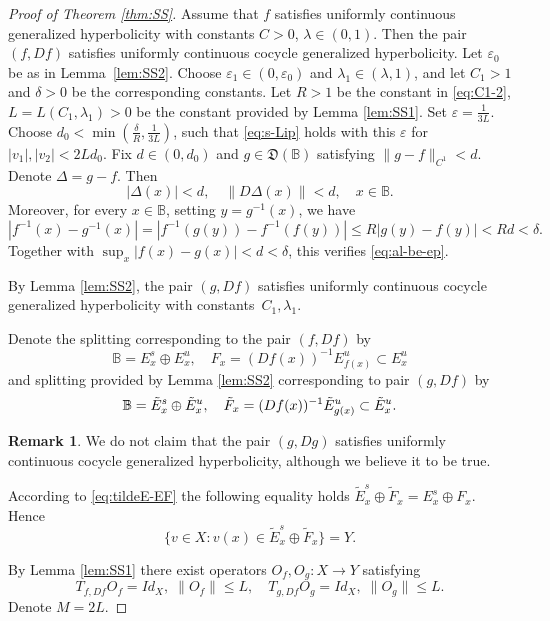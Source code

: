 \documentclass[12pt]{article}
\newcommand{\Bb}{\mathbb{B}}
\newcommand{\DUC}{\mathfrak{D}}
\theoremstyle{definition}
\newtheorem{remark}[thm]{Remark}
\begin{document}
\begin{proof}[Proof of Theorem \ref{thm:SS}]
Assume that $f$ satisfies uniformly continuous generalized hyperbolicity with constants $C > 0$, $\lambda \in (0, 1)$. Then the pair $(f, Df)$ satisfies uniformly continuous cocycle generalized hyperbolicity.
Let $\varepsilon_0$ be as in Lemma~\ref{lem:SS2}. Choose $\varepsilon_1 \in (0,\varepsilon_0)$ and $\lambda_1\in(\lambda,1)$, and let $C_1>1$ and $\delta>0$ be the corresponding constants.
Let $R > 1$ be the constant in \eqref{eq:C1-2}, $L = L(C_1, \lambda_1)>0$ be the constant provided by Lemma \ref{lem:SS1}. Set $\varepsilon=\frac{1}{3L}$. Choose $d_0 < \min(\frac{\delta}{R}, \frac{1}{3L})$, such that \eqref{eq:s-Lip} holds with this $\varepsilon$ for $|v_1|, |v_2| < 2Ld_0$. 
Fix $d\in(0,d_0)$ and $g\in\DUC(\Bb)$ satisfying $\|g-f\|_{C^1}<d$.
Denote $\Delta = g - f$. 
Then
    \begin{equation}\label{eq:Delta-c1}
        |\Delta(x)| < d, \quad \|D\Delta(x)\| < d, \quad x \in \Bb. 
    \end{equation}
Moreover, for every $x\in\Bb$, setting $y=g^{-1}(x)$, we have
\[
|f^{-1}(x)-g^{-1}(x)|
=
|f^{-1}(g(y))-f^{-1}(f(y))|
\leq R|g(y)-f(y)|
<Rd<\delta.
\]
Together with $\sup_x|f(x)-g(x)|<d<\delta$, this verifies
\eqref{eq:al-be-ep}.
    
By Lemma \ref{lem:SS2}, the pair $(g, Df)$ satisfies uniformly continuous cocycle generalized hyperbolicity with constants~$C_1, \lambda_1$. 

Denote the splitting corresponding to the pair $(f, Df)$ by 
$$
\Bb = E^s_x \oplus E^u_x, \quad F_x = (Df(x))^{-1}E^u_{f(x)} \subset E^u_x
$$
and splitting provided by Lemma \ref{lem:SS2} corresponding to pair $(g, Df)$ by 
\begin{equation}\notag%
\Bb = \tilde{E}^s_x \oplus \tilde{E}^u_x, \quad \tilde{F}_x = (Df(x))^{-1}\tilde{E}^u_{g(x)} \subset \tilde{E}^u_x.
\end{equation}
\begin{remark}
We do not claim that the pair $(g, Dg)$ satisfies uniformly continuous cocycle generalized hyperbolicity, although we believe it to be true. 
\end{remark}
According to \eqref{eq:tildeE-EF} the following equality holds
$
\tilde{E}^s_x \oplus \tilde{F}_x = {E}^s_x \oplus {F}_x.
$
Hence
$$
\{v \in X: v(x) \in \tilde{E}_x^s \oplus \tilde{F}_x\} = Y.
$$

By Lemma \ref{lem:SS1} there exist operators $O_f, O_g: X \to Y$
satisfying 
$$
T_{f, Df}O_f = Id_X, \; \|O_f\| \leq L,
\quad
T_{g, Df}O_g = Id_X, \; \|O_g\| \leq L.
$$
Denote $M = 2L$.


\end{proof}
\end{document}
